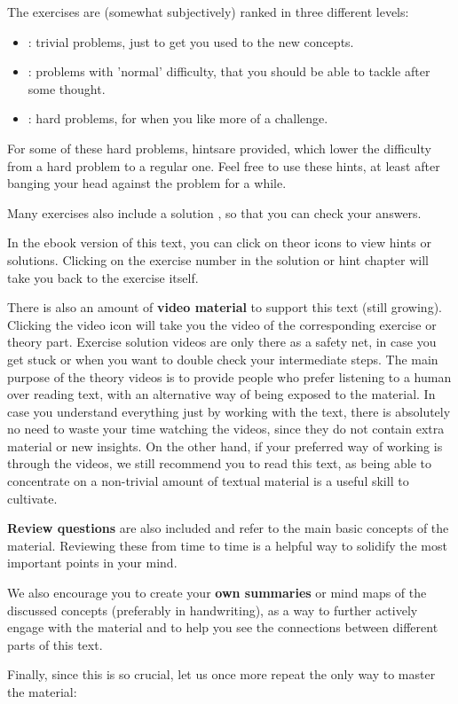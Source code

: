 The exercises are (somewhat subjectively) ranked in three different levels:

\begin{itemize}
\item \iconoffset\trivial : trivial problems, just to get you used to the new concepts.
\item \iconoffset\normal : problems with 'normal' difficulty, that you should be able to tackle after some thought.
\item \iconoffset\hard : hard problems, for when you like more of a challenge.
\end{itemize}

For some of these hard problems, hints\iconoffset\hint are provided, which lower the difficulty from a hard problem to a regular one. Feel free to use these hints, at least after banging your head against the problem for a while.

Many exercises also include a solution \iconoffset\solution, so that you can check your answers.

In the ebook version of this text, you can click on the\iconoffset\hint or \iconoffset\solution icons to view hints or solutions. Clicking on the exercise number in the solution or hint chapter will take you back to the exercise itself.

There is also an amount of \textbf{video material} to support this text (still growing). Clicking the video icon \iconoffset\youtube will take you the video of the corresponding exercise or theory part. Exercise solution videos are only there as a safety net, in case you get stuck or when you want to double check your intermediate steps. The main purpose of the theory videos is to provide people who prefer listening to a human over reading text, with an alternative way of being exposed to the material. In case you understand everything just by working with the text, there is absolutely no need to waste your time watching the videos, since they do not contain extra material or new insights. On the other hand, if your preferred way of working is through the videos, we still recommend you to read this text, as being able to concentrate on a non-trivial amount of textual material is a useful skill to cultivate.

\textbf{Review questions} are also included and refer to the main basic concepts of the material. Reviewing these from time to time is a helpful way to solidify the most important points in your mind.

We also encourage you to create your \textbf{own summaries} or mind maps of the discussed concepts (preferably in handwriting), as a way to further actively engage with the material and to help you see the connections between different parts of this text.

Finally, since this is so crucial, let us once more repeat the only way to master the material:
\\



